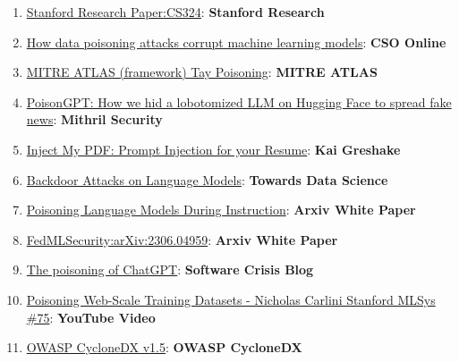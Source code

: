 \documentclass[
]{article}
\providecommand{\tightlist}{%
  \setlength{\itemsep}{0pt}\setlength{\parskip}{0pt}}
\begin{document}
\begin{enumerate}
\def\labelenumi{\arabic{enumi}.}
\tightlist
\item
  \href{https://stanford-cs324.github.io/winter2022/lectures/data/}{Stanford
  Research Paper:CS324}: \textbf{Stanford Research}
\item
  \href{https://www.csoonline.com/article/3613932/how-data-poisoning-attacks-corrupt-machine-learning-models.html}{How
  data poisoning attacks corrupt machine learning models}: \textbf{CSO
  Online}
\item
  \href{https://atlas.mitre.org/studies/AML.CS0009/}{MITRE ATLAS
  (framework) Tay Poisoning}: \textbf{MITRE ATLAS}
\item
  \href{https://blog.mithrilsecurity.io/poisongpt-how-we-hid-a-lobotomized-llm-on-hugging-face-to-spread-fake-news/}{PoisonGPT:
  How we hid a lobotomized LLM on Hugging Face to spread fake news}:
  \textbf{Mithril Security}
\item
  \href{https://kai-greshake.de/posts/inject-my-pdf/}{Inject My PDF:
  Prompt Injection for your Resume}: \textbf{Kai Greshake}
\item
  \href{https://towardsdatascience.com/backdoor-attacks-on-language-models-can-we-trust-our-models-weights-73108f9dcb1f}{Backdoor
  Attacks on Language Models}: \textbf{Towards Data Science}
\item
  \href{https://arxiv.org/abs/2305.00944}{Poisoning Language Models
  During Instruction}: \textbf{Arxiv White Paper}
\item
  \href{https://arxiv.org/abs/2306.04959}{FedMLSecurity:arXiv:2306.04959}:
  \textbf{Arxiv White Paper}
\item
  \href{https://softwarecrisis.dev/letters/the-poisoning-of-chatgpt/}{The
  poisoning of ChatGPT}: \textbf{Software Crisis Blog}
\item
  \href{https://www.youtube.com/watch?v=h9jf1ikcGyk}{Poisoning Web-Scale
  Training Datasets - Nicholas Carlini \textbar{} Stanford MLSys \#75}:
  \textbf{YouTube Video}
\item
  \href{https://cyclonedx.org/capabilities/mlbom/}{OWASP CycloneDX
  v1.5}: \textbf{OWASP CycloneDX}
\end{enumerate}
\end{document}
